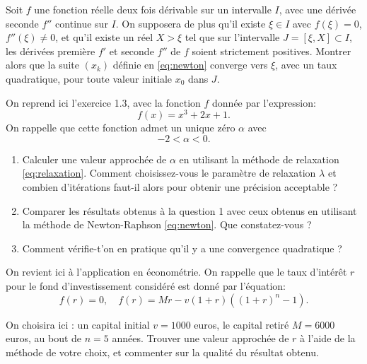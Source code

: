 \begin{exercice}

Soit $f$ une fonction réelle deux fois dérivable sur un intervalle $I$, avec une dérivée seconde $f''$ continue sur $I$. On supposera de plus qu'il existe $\xi \in I$ avec $f(\xi) = 0$, $f''(\xi)\neq0$,
et qu'il existe un réel $X > \xi$ tel que sur l'intervalle $J=[\xi,X] \subset I$, les dérivées première $f'$ et seconde $f''$ de $f$ soient strictement positives. Montrer alors que la suite $(x_k)$ définie en \eqref{eq:newton} converge vers $\xi$, avec un taux quadratique, pour toute valeur initiale $x_0$ dans $J$.

\end{exercice}

\medskip

\begin{exercice}

On reprend ici l'exercice 1.3, avec la fonction $f$ donnée par l'expression:
\[
f(x) = x^3 + 2 x + 1.
\]
On rappelle que cette fonction admet un unique zéro $\alpha$ avec
\[
-2 < \alpha < 0.
\]

\begin{enumerate}

\item Calculer une valeur approchée de $\alpha$ en utilisant la méthode de relaxation \eqref{eq:relaxation}. Comment choisissez-vous le paramètre de relaxation $\lambda$ et combien d'itérations faut-il alors pour obtenir une précision acceptable ?

\item Comparer les résultats obtenus à la question 1 avec ceux obtenus en utilisant la méthode de Newton-Raphson \eqref{eq:newton}. Que constatez-vous ?

\item Comment vérifie-t'on en pratique qu'il y a une convergence quadratique ? 

\end{enumerate}

\end{exercice}

\medskip

\begin{exercice}

On revient ici à l'application en économétrie. On rappelle que le taux d'intérêt $r$ pour le fond d'investissement considéré est donné par l'équation:
\[
f(r)=0, \quad f(r) = M r - v {(1+r)} \left ( (1+r)^n - 1 \right).
\]

On choisira ici : un capital initial $v=1000$ euros, le capital retiré $M=6000$ euros, au bout de $n=5$ années. Trouver une valeur approchée de $r$ à l'aide de la méthode de votre choix, et commenter sur la qualité du résultat obtenu.

\end{exercice}

